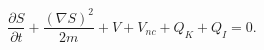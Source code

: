 \begin{equation}
\frac{\partial S}{\partial t}+\frac{\left(  \nabla S\right)  ^{2}}%
{2m}+V+V_{nc}+Q_{K}+Q_{I}=0.\label{15}%
\end{equation}

